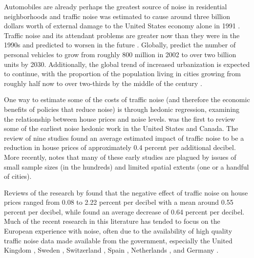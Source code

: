 \documentclass{article}\usepackage{graphicx, color}
\begin{document}
Automobiles are already perhaps the greatest source of noise in residential neighborhoods \citep{Barber2010} and traffic noise was estimated to cause around three billion dollars worth of external damage to the United States economy alone in 1991 \citep{Delucchi1998}. Traffic noise and its attendant problems are greater now than they were in the 1990s and predicted to worsen in the future \citep{Goines2007}.  %
Globally, \citet{Dargay2007} predict the number of personal vehicles to grow from roughly 800 million in 2002 to over two billion units by 2030. Additionally, the global trend of increased urbanization is expected to continue, with the proportion of the population living in cities growing from roughly half now to over two-thirds by the middle of the century . 

One way to estimate some of the costs of traffic noise (and therefore the economic benefits of policies that reduce noise) is through hedonic regression, examining the relationship between house prices and noise levels. \citet{Nelson1982} was the first to review some of the earliest noise hedonic work in the United States and Canada. The review of nine studies found an average estimated impact of traffic noise to be a reduction in house prices of approximately 0.4 percent per additional decibel. More recently, \citet{Nelson2008} notes that many of these early studies \citep[such as][]{Gamble1974, Langley1976} are plagued by issues of small sample sizes (in the hundreds) and limited spatial extents (one or a handful of cities). 

Reviews of the research by \citet{Bateman2001} found that the negative effect of traffic noise on house prices ranged from 0.08 to 2.22 percent per decibel with a mean around 0.55 percent per decibel, while \citet{Navrud2002} found an average decrease of 0.64 percent per decibel. Much of the recent research in this literature has tended to focus on the European experience with noise, often due to the availability of high quality traffic noise data made available from the government, especially the United Kingdom \citep{Day2007, Blanco2011}, Sweden \citep{Wilhelmsson2000, Andersson2010}, Switzerland \citep{Baranzini2010}, Spain \citep{MarmolejoDuarteCarlos;GonzalezTamez2009}, Netherlands \citep{Theebe2004a}, and Germany \citep{Brandt2011}. 
\end{document}
